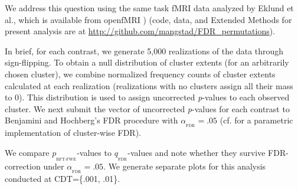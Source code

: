 \documentclass[9pt,twocolumn,twoside]{pnas-new}
\newcommand{\subtext}[2]{
#1_{_{\text{#2}}}
}
\begin{document}
We address this question using the same task fMRI data \cite{duncan_consistency_2009,tom_neural_2007} analyzed by Eklund et al., which is available from openfMRI \cite{poldrack_toward_2013})  (code, data, and Extended Methods for present analysis are at \url{http://github.com/mangstad/FDR_permutations}).

In brief, for each contrast, we generate 5,000 realizations of the data through sign-flipping. 
To obtain a null distribution of cluster extents (for an arbitrarily chosen cluster), we combine normalized frequency counts of cluster extents calculated at each realization (realizations with no clusters assign all their mass to 0). 
This distribution is used to assign uncorrected \textit{p}-values to each observed cluster. 
We next submit the vector of uncorrected \textit{p}-values for each contrast to Benjamini and Hochberg's \cite{benjamini_controlling_1995} FDR procedure with $\subtext{\alpha}{FDR}=.05$ (cf. \cite{chumbley_false_2009} for a parametric implementation of cluster-wise FDR).
 
We compare $\subtext{p}{RFT-FWE}$-values to $\subtext{q}{FDR}$-values and note whether they survive FDR-correction under $\subtext{\alpha}{FDR}=.05$. 
We generate separate plots for this analysis conducted at CDT=\{.001, .01\}.
\end{document}
